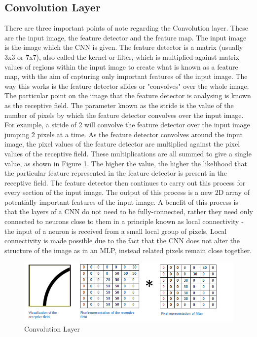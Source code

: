 \documentclass[12pt]{report}
\begin{document}
\subsection{Convolution Layer}
\begin{flushleft}
There are three important points of note regarding the Convolution layer. These are the input image, the feature detector and the feature map. The input image is the image which the CNN is given. The feature detector is a matrix (usually 3x3 or 7x7), also called the kernel or filter, which is multiplied against matrix values of regions within the input image to create what is known as a feature map, with the aim of capturing only important features of the input image. The way this works is the feature detector slides or "convolves" over the whole image. The particular point on the image that the feature detector is analysing is known as the receptive field. The parameter known as the stride is the value of the number of pixels by which the feature detector convolves over the input image. For example, a stride of 2 will convolve the feature detector over the input image jumping 2 pixels at a time. As the feature detector convolves around the input image, the pixel values of the feature detector are multiplied against the pixel values of the receptive field. These multiplications are all summed to give a single value, as shown in Figure \ref{fig:conv}. The higher the value, the higher the likelihood that the particular feature represented in the feature detector is present in the receptive field. The feature detector then continues to carry out this process for every section of the input image. The output of this process is a new 2D array of potentially important features of the input image. A benefit of this process is that the layers of a CNN do not need to be fully-connected, rather they need only connected to neurons close to them in a principle known as local connectivity - the input of a neuron is received from a small local group of pixels. Local connectivity is made possible due to the fact that the CNN does not alter the structure of the image as in an MLP, instead related pixels remain close together.
\end{flushleft}

\vspace{0.5cm}
\begin{figure}[ht!]
	\centering
	\includegraphics[width=12cm]{conv}
	\caption{Convolution Layer}
	\label{fig:conv}
\end{figure}
\end{document}
